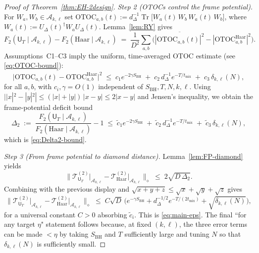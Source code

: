 \documentclass[a4paper,11pt]{article}
\let\mathscr\mathcal
\newcommand{\Tr}{\operatorname{Tr}}
\theoremstyle{plain}
\theoremstyle{definition}
\theoremstyle{remark}
\begin{document}
\begin{proof}[Proof of Theorem~\ref{thm:EH-2design}]
\emph{Step 2 (OTOCs control the frame potential).} For $W_a,W_b\in\mathscr{A}_{k,\ell}$ set
$\mathrm{OTOC}_{a,b}(t):=d_\Delta^{-1}\Tr\!\big[W_a(t)\,W_b\,W_a(t)\,W_b\big]$, where $W_a(t):=U_\Delta(t)^\dagger W_a U_\Delta(t)$.
Lemma~\ref{lem:RY} gives
\begin{equation*}
  F_2(\mathsf{U}_T \!\mid\! \mathscr{A}_{k,\ell})-F_2(\mathrm{Haar}\!\mid\!\mathscr{A}_{k,\ell})
  \;=\; \frac{1}{D^2}\sum_{a,b}\Big(\overline{|\mathrm{OTOC}_{a,b}(t)|^2}-|\mathrm{OTOC}^{\mathrm{Haar}}_{a,b}|^2\Big).
\end{equation*}
Assumptions~C1--C3 imply the uniform, time-averaged OTOC estimate (see \eqref{eq:OTOC-bound}):
\begin{equation*}
 \overline{\big|\mathrm{OTOC}_{a,b}(t)-\mathrm{OTOC}^{\mathrm{Haar}}_{a,b}\big|^2}
 \;\le\; c_1 e^{-2\gamma S_{\mathrm{BH}}} \;+\; c_2\, d_\Delta^{-1} e^{-T/t_{\mathrm{mix}}} \;+\; c_3\, \delta_{k,\ell}(N),
\end{equation*}
for all $a,b$, with $c_i,\gamma=O(1)$ independent of $S_{\mathrm{BH}},T,N,k,\ell$. Using $||x|^2-|y|^2|\le(|x|+|y|)\,|x-y|\le 2|x-y|$
and Jensen's inequality, we obtain the frame-potential deficit bound
\begin{equation*}
 \Delta_2 \;:=\; \frac{F_2(\mathsf{U}_T \!\mid\! \mathscr{A}_{k,\ell})}{F_2(\mathrm{Haar}\!\mid\!\mathscr{A}_{k,\ell})}-1
 \;\le\; \tilde c_1 e^{-2\gamma S_{\mathrm{BH}}} \;+\; \tilde c_2\, d_\Delta^{-1} e^{-T/t_{\mathrm{mix}}} \;+\; \tilde c_3\, \delta_{k,\ell}(N),
\end{equation*}
which is \eqref{eq:Delta2-bound}.

\emph{Step 3 (From frame potential to diamond distance).} Lemma~\ref{lem:FP-diamond} yields
\begin{equation*}
 \Big\| \mathcal{T}^{(2)}_{\mathsf{U}_T}\big|_{\mathscr{A}_{k,\ell}} - \mathcal{T}^{(2)}_{\mathrm{Haar}}\big|_{\mathscr{A}_{k,\ell}} \Big\|_{\diamond}
 \;\le\; 2\sqrt{D\,\Delta_2}.
\end{equation*}
Combining with the previous display and $\sqrt{x+y+z}\le \sqrt{x}+\sqrt{y}+\sqrt{z}$ gives
\begin{equation*}
 \Big\| \mathcal{T}^{(2)}_{\mathsf{U}_T}\big|_{\mathscr{A}_{k,\ell}} - \mathcal{T}^{(2)}_{\mathrm{Haar}}\big|_{\mathscr{A}_{k,\ell}} \Big\|_{\diamond}
 \;\le\; C \sqrt{D}\,\Big( e^{-\gamma S_{\mathrm{BH}}} + d_\Delta^{-1/2} e^{-T/(2t_{\mathrm{mix}})} + \sqrt{\delta_{k,\ell}(N)} \Big),
\end{equation*}
for a universal constant $C>0$ absorbing $\tilde c_i$. This is \eqref{eq:main-eps}. The final ``for any target $\eta$" statement
follows because, at fixed $(k,\ell)$, the three error terms can be made $<\eta$ by taking $S_{\mathrm{BH}}$ and $T$ sufficiently
large and tuning $N$ so that $\delta_{k,\ell}(N)$ is sufficiently small.
\end{proof}
\end{document}
